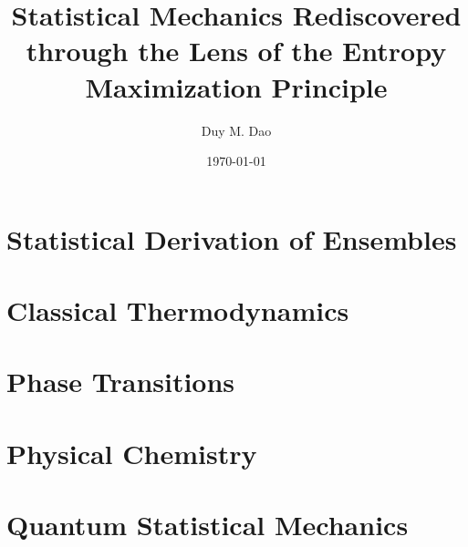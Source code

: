 \documentclass[11pt]{article}      %
\title{Statistical Mechanics Rediscovered through the Lens of the Entropy Maximization Principle}
\author{Duy M. Dao}
\date{\today}                      %
\numberwithin{equation}{section}   %
\begin{document}
\maketitle                         %
\tableofcontents                   %

\newpage
\part{Statistical Derivation of Ensembles}
    
    
    
    
\part{Classical Thermodynamics}
    
    
    
    
\part{Phase Transitions}
    
    

\part{Physical Chemistry}

\part{Quantum Statistical Mechanics}
\end{document}
